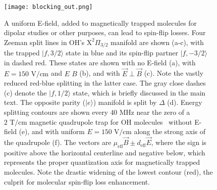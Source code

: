 \documentclass[%
 reprint,
 amsmath,amssymb,
 aps,
prl,
]{revtex4-1}
\newcommand{\epb}{{$\vec{E}\!\perp\!\vec{B}$}}
\begin{document}

\begin{figure}[tb]
\texttt{[image: blocking\_out.png]}%
\caption{
A uniform E-field, added to magnetically trapped molecules for dipolar studies or other purposes, can lead to spin-flip losses. 
Four Zeeman split lines in OH's $\mathrm{X}^2\Pi_{3/2}$ manifold are shown (a-c), with the trapped $|f,3/2\rangle$ state in blue and its spin-flip partner $|f,-3/2\rangle$ in dashed red. 
These states are shown with no E-field (a), with $E=150\text{ V/cm}$ and $E\,$\raisebox{0.5px}{$\parallel$}$\,B$ (b), and with \epb{} (c). 
Note the vastly reduced red-blue splitting in the latter case. 
The gray close dashes (c) denote the $|f,1/2\rangle$ state, which is briefly discussed in the main text.
The opposite parity ($|e\rangle$) manifold is split by $\Delta$ (d). 
Energy splitting contours are shown every $40\text{ MHz}$ near the zero of a $2\text{ T/cm}$ magnetic quadrupole trap for OH molecules~\cite{Stuhl2012uwave} without E-field (e), and with uniform $E=150\text{ V/cm}$ along the strong axis of the quadrupole (f). 
The vectors are $\mu_\text{eff}\vec{B}\pm d_\text{eff}\vec{E}$, where the sign is positive above the horizontal centerline and negative below, which  represents the proper quantization axis for magnetically trapped molecules. 
Note the drastic widening of the lowest contour (red), the culprit for molecular spin-flip loss enhancement.
}
\label{fig:blocking}
\end{figure}
\end{document}
